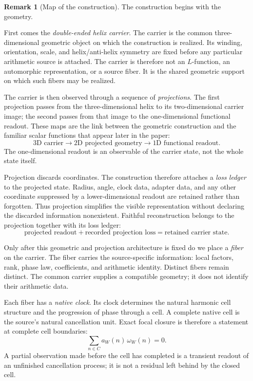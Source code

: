 \documentclass[11pt]{article}
\theoremstyle{definition}
\newtheorem{remark}[theorem]{Remark}
\begin{document}
\begin{remark}[Map of the construction]\label{rem:construction-map}
The construction begins with the geometry.

First comes the \emph{double-ended helix carrier}.  The carrier is the common
three-dimensional geometric object on which the construction is realized.  Its
winding, orientation, scale, and helix/anti-helix symmetry are fixed before any
particular arithmetic source is attached.  The carrier is therefore not an
$L$-function, an automorphic representation, or a source fiber.  It is the
shared geometric support on which such fibers may be realized.

The carrier is then observed through a sequence of \emph{projections}.
The first projection passes from the three-dimensional helix to its
two-dimensional carrier image; the second passes from that image to the
one-dimensional functional readout.  These maps are the link between the
geometric construction and the familiar scalar functions that appear later in
the paper:
\[
\text{3D carrier}
\longrightarrow
\text{2D projected geometry}
\longrightarrow
\text{1D functional readout}.
\]
The one-dimensional readout is an observable of the carrier state, not the
whole state itself.

Projection discards coordinates.  The construction therefore attaches a
\emph{loss ledger} to the projected state.  Radius, angle, clock data, adapter
data, and any other coordinate suppressed by a lower-dimensional readout are
retained rather than forgotten.  Thus projection simplifies the visible
representation without declaring the discarded information nonexistent.
Faithful reconstruction belongs to the projection together with its loss
ledger:
\[
\boxed{\text{projected readout}+\text{recorded projection loss}
       =\text{retained carrier state}.}
\]

Only after this geometric and projection architecture is fixed do we place a
\emph{fiber} on the carrier.  The fiber carries the source-specific
information: local factors, rank, phase law, coefficients, and arithmetic
identity.  Distinct fibers remain distinct.  The common carrier supplies a
compatible geometry; it does not identify their arithmetic data.

Each fiber has a \emph{native clock}.  Its clock determines the natural
harmonic cell structure and the progression of phase through a cell.  A
complete native cell is the source's natural cancellation unit.  Exact focal
closure is therefore a statement at complete cell boundaries:
\[
\sum_{n\in C} a_W(n)\,\omega_W(n)=0.
\]
A partial observation made before the cell has completed is a transient
readout of an unfinished cancellation process; it is not a residual left
behind by the closed cell.


\end{remark}
\end{document}
